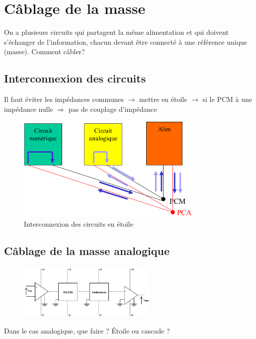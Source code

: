 \section{Câblage de la masse}
On a plusieurs circuits qui partagent la même alimentation et qui doivent s'échanger de l'information, chacun devant être connecté à une référence unique (masse). Comment câbler?
\subsection{Interconnexion des circuits}
Il faut éviter les impédances communes \(\rightarrow\) mettre en étoile \(\rightarrow\) si le PCM à une impédance nulle \(\Rightarrow\) pas de couplage d'impédance
\begin{figure}[H] 
	\centering 
	\includegraphics[width=0.8\textwidth,height=10\baselineskip,keepaspectratio]{ch3/image25} 
	\caption{Interconnexion des circuits en étoile} 
\end{figure} 
\subsection{Câblage de la masse analogique}
\begin{figure}[H] 
	\centering 
	\includegraphics[width=0.6\textwidth,height=10\baselineskip,keepaspectratio]{ch3/image26}
\end{figure}
Dans le cas analogique, que faire ? Étoile ou cascade ?
